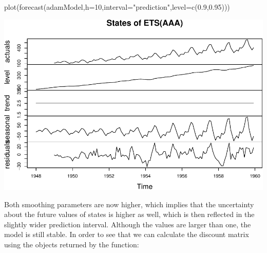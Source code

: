\documentclass[
]{book}
\newenvironment{Shaded}{\begin{snugshade}}{\end{snugshade}}
\newcommand{\AttributeTok}[1]{\textcolor[rgb]{0.77,0.63,0.00}{#1}}
\newcommand{\ConstantTok}[1]{\textcolor[rgb]{0.00,0.00,0.00}{#1}}
\newcommand{\DecValTok}[1]{\textcolor[rgb]{0.00,0.00,0.81}{#1}}
\newcommand{\FloatTok}[1]{\textcolor[rgb]{0.00,0.00,0.81}{#1}}
\newcommand{\FunctionTok}[1]{\textcolor[rgb]{0.00,0.00,0.00}{#1}}
\newcommand{\NormalTok}[1]{#1}
\newcommand{\OtherTok}[1]{\textcolor[rgb]{0.56,0.35,0.01}{#1}}
\newcommand{\SpecialCharTok}[1]{\textcolor[rgb]{0.00,0.00,0.00}{#1}}
\newcommand{\StringTok}[1]{\textcolor[rgb]{0.31,0.60,0.02}{#1}}
\theoremstyle{definition}
\theoremstyle{definition}
\theoremstyle{definition}
\theoremstyle{definition}
\theoremstyle{remark}
\begin{document}
\begin{Shaded}
\begin{Highlighting}[]
\FunctionTok{plot}\NormalTok{(}\FunctionTok{forecast}\NormalTok{(adamModel,}\AttributeTok{h=}\DecValTok{10}\NormalTok{,}\AttributeTok{interval=}\StringTok{"prediction"}\NormalTok{,}\AttributeTok{level=}\FunctionTok{c}\NormalTok{(}\FloatTok{0.9}\NormalTok{,}\FloatTok{0.95}\NormalTok{)))}
\end{Highlighting}
\end{Shaded}

\includegraphics{adam_files/figure-latex/unnamed-chunk-34-1.pdf}

Both smoothing parameters are now higher, which implies that the uncertainty about the future values of states is higher as well, which is then reflected in the slightly wider prediction interval. Although the values are larger than one, the model is still stable. In order to see that we can calculate the discount matrix using the objects returned by the function:

\begin{Shaded}
\end{Shaded}
\end{document}
